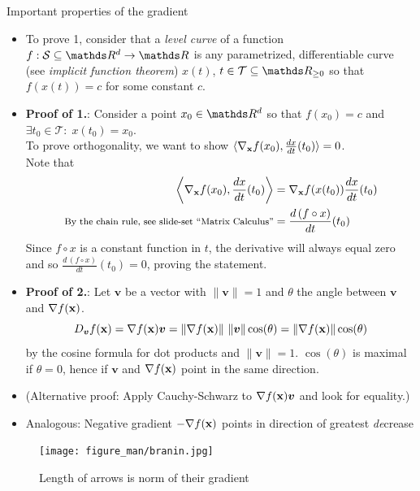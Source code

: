 \documentclass[11pt,compress,t,notes=noshow, xcolor=table]{beamer}
\newcommand{\deriv}{d}
\begin{document}
\begin{vbframe}{Important properties of the gradient}
\begin{center}
\end{center}
\framebreak
\begin{itemize}\setlength{\itemsep}{0.5\baselineskip}
    \item To prove 1, consider that a \emph{level curve} of a function $f: \mathcal{S}\subseteq \R^d \to \R$ is any parametrized, differentiable curve (see \emph{implicit function theorem}) $x(t)$, $t\in\mathcal{T}\subseteq\R_{\geq 0}$ so that $f(x(t))=c$ for some constant $c$.
    \item \textbf{Proof of 1.}: Consider a point $x_0\in\R^d$ so that $f(x_0)=c$ and $\exists t_0\in\mathcal{T}:\; x(t_0)=x_0$.\\\bigskip
    To prove orthogonality, we want to show $\langle\nabla_{\xv}f(x_0),\frac{\deriv x}{\deriv t}(t_0)\rangle=0$.\\
    Note that\begin{align*}
        \left\langle\nabla_{\xv}f(x_0),\frac{\deriv x}{\deriv t}(t_0)\right\rangle&=\nabla_{\xv}f(x(t_0))\frac{\deriv x}{\deriv t}(t_0)\\
        \text{\footnotesize By the chain rule, see slide-set ``Matrix Calculus''}&=\frac{\deriv\, (f\circ x)}{\deriv t}(t_0)
    \end{align*}
    Since $f\circ x$ is a constant function in $t$, the derivative will always equal zero and so $\frac{\deriv\, (f\circ x)}{\deriv t}(t_0)=0$, proving the statement.
\end{itemize}
\framebreak
\begin{itemize}\setlength{\itemsep}{0.5\baselineskip}
    \item \textbf{Proof of 2.}: Let $\bm{v}$ be a vector with $\|\bm{v}\|=1$ and $\theta$ the angle between $\bm{v}$ and $\nabla f(\mathbf{x})$.
        \begin{equation*}
            D_{\bm{v}}f(\mathbf{x}) = \nabla f(\mathbf{x}) \bm{v} = \|\nabla f(\mathbf{x})\|~\|\bm{v}\|\cos(\theta) = \|\nabla f(\mathbf{x})\| \cos(\theta)
        \end{equation*}
    	by the cosine formula for dot products and $\|\bm{v}\| = 1$.
        $\cos(\theta)$ is maximal if $\theta = 0$, hence if $\bm{v}$ and $\nabla f(\mathbf{x})$ point in the same direction.

    	\item (Alternative proof: Apply Cauchy-Schwarz to $\nabla f(\mathbf{x}) \bm{v}$ and look for equality.)

        \item Analogous: Negative gradient $- \nabla f(\mathbf{x})$ points in direction of greatest \textit{de}crease
\end{itemize}
\framebreak

\begin{figure}
    \centering
    \texttt{[image: figure\_man/branin.jpg]}
    \caption*{Length of arrows is norm of their gradient}
\end{figure}

\end{vbframe}
\end{document}
